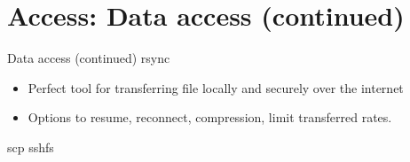 {
\section{Access: Data access (continued)}
%
\begin{frame}{Data access (continued)}
\text rsync
\begin{itemize}
\item Perfect tool for transferring file locally and securely over the internet
\item Options to resume, reconnect, compression, limit transferred rates.
\end{itemize}
\text scp
\text sshfs
\end{frame}
}

